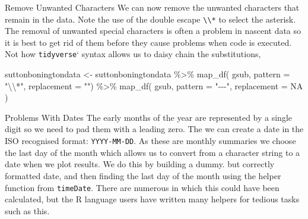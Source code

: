 \documentclass[
  ignorenonframetext,
]{beamer}
\newenvironment{Shaded}{\begin{snugshade}}{\end{snugshade}}
\newcommand{\AttributeTok}[1]{\textcolor[rgb]{0.77,0.63,0.00}{#1}}
\newcommand{\ConstantTok}[1]{\textcolor[rgb]{0.00,0.00,0.00}{#1}}
\newcommand{\FunctionTok}[1]{\textcolor[rgb]{0.00,0.00,0.00}{#1}}
\newcommand{\NormalTok}[1]{#1}
\newcommand{\OtherTok}[1]{\textcolor[rgb]{0.56,0.35,0.01}{#1}}
\newcommand{\SpecialCharTok}[1]{\textcolor[rgb]{0.00,0.00,0.00}{#1}}
\newcommand{\StringTok}[1]{\textcolor[rgb]{0.31,0.60,0.02}{#1}}
\begin{document}
\begin{frame}[fragile]{Remove Unwanted Characters}
\protect\hypertarget{remove-unwanted-characters}{}
We can now remove the unwanted characters that remain in the data. Note
the use of the double escape \texttt{\textbackslash{}\textbackslash{}*}
to select the asterisk. The removal of unwanted special characters is
often a problem in nascent data so it is best to get rid of them before
they cause problems when code is executed. Not how \texttt{tidyverse}`
syntax allows us to daisy chain the substitutions,

\begin{Shaded}
\begin{Highlighting}[]
\NormalTok{suttonboningtondata }\OtherTok{\textless{}{-}}\NormalTok{ suttonboningtondata }\SpecialCharTok{\%\textgreater{}\%}
                        \FunctionTok{map\_df}\NormalTok{( gsub,}
                                \AttributeTok{pattern =} \StringTok{"}\SpecialCharTok{\textbackslash{}\textbackslash{}}\StringTok{*"}\NormalTok{,}
                                \AttributeTok{replacement =} \StringTok{""}\NormalTok{) }\SpecialCharTok{\%\textgreater{}\%}
                        \FunctionTok{map\_df}\NormalTok{( gsub,}
                                \AttributeTok{pattern =} \StringTok{"{-}{-}{-}"}\NormalTok{,}
                                \AttributeTok{replacement =} \ConstantTok{NA}
\NormalTok{                                )}
\end{Highlighting}
\end{Shaded}
\end{frame}

\begin{frame}[fragile]{Problems With Dates}
\protect\hypertarget{problems-with-dates}{}
The early months of the year are represented by a single digit so we
need to pad them with a leading zero. The we can create a date in the
ISO recognised format: \texttt{YYYY-MM-DD}. As these are monthly
summaries we choose the last day of the month which allows us to convert
from a character string to a date when we plot results. We do this by
building a dummy. but correctly formatted date, and then finding the
last day of the month using the helper function from \texttt{timeDate}.
There are numerous in which this could have been calculated, but the R
language users have written many helpers for tedious tasks such as this.
\end{frame}
\end{document}
